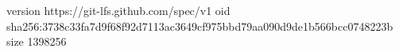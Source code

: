 version https://git-lfs.github.com/spec/v1
oid sha256:3738c33fa7d9f68f92d7113ac3649cf975bbd79aa090d9de1b566bcc0748223b
size 1398256
